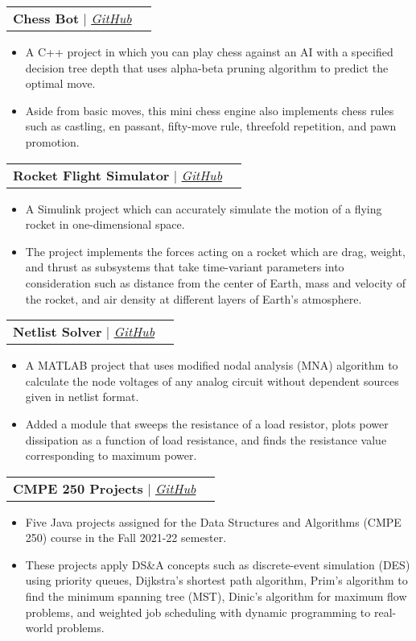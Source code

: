 \documentclass[letterpaper,11pt]{article}
\makeatletter
\newcommand{\resumeItem}[1]{
  \item\small{
    { #1 \vspace{-2pt} }
  }
}
\newcommand{\resumeProjectHeading}[2]{
    \vspace{-2pt}\item
    \begin{tabular*}{0.97\textwidth}{l@{\extracolsep {\fill} } r}
      \small#1 & #2 \\
    \end{tabular*}\vspace{-7pt}
}
\newcommand{\resumeItemListStart}{\begin{itemize} }
\newcommand{\resumeItemListEnd}{\end{itemize}\vspace{-5pt} }
\makeatother
\begin{document}
      \resumeProjectHeading
        {\textbf{Chess Bot} $|$ \emph{\href{https://github.com/arasgungore/chess-bot}{\color{blue}GitHub} } }{}
          \resumeItemListStart
            \resumeItem{A C++ project in which you can play chess against an AI with a specified decision tree depth that uses alpha-beta pruning algorithm to predict the optimal move.}
            \resumeItem{Aside from basic moves, this mini chess engine also implements chess rules such as castling, en passant, fifty-move rule, threefold repetition, and pawn promotion.}
          \resumeItemListEnd
      
      \resumeProjectHeading
        {\textbf{Rocket Flight Simulator} $|$ \emph{\href{https://github.com/arasgungore/rocket-flight-simulator}{\color{blue}GitHub} } }{}
          \resumeItemListStart
            \resumeItem{A Simulink project which can accurately simulate the motion of a flying rocket in one-dimensional space.}
            \resumeItem{The project implements the forces acting on a rocket which are drag, weight, and thrust as subsystems that take time-variant parameters into consideration such as distance from the center of Earth, mass and velocity of the rocket, and air density at different layers of Earth's atmosphere.}
          \resumeItemListEnd
      
      \resumeProjectHeading
        {\textbf{Netlist Solver} $|$ \emph{\href{https://github.com/arasgungore/netlist-solver}{\color{blue}GitHub} } }{}
          \resumeItemListStart
            \resumeItem{A MATLAB project that uses modified nodal analysis (MNA) algorithm to calculate the node voltages of any analog circuit without dependent sources given in netlist format.}
            \resumeItem{Added a module that sweeps the resistance of a load resistor, plots power dissipation as a function of load resistance, and finds the resistance value corresponding to maximum power.}
          \resumeItemListEnd
      
      \resumeProjectHeading
        {\textbf{CMPE 250 Projects} $|$ \emph{\href{https://github.com/arasgungore/CMPE250-projects}{\color{blue}GitHub} } }{}
          \resumeItemListStart
            \resumeItem{Five Java projects assigned for the Data Structures and Algorithms (CMPE 250) course in the Fall 2021-22 semester.}
            \resumeItem{These projects apply DS\&A concepts such as discrete-event simulation (DES) using priority queues, Dijkstra's shortest path algorithm, Prim's algorithm to find the minimum spanning tree (MST), Dinic's algorithm for maximum flow problems, and weighted job scheduling with dynamic programming to real-world problems.}
          \resumeItemListEnd
      
\end{document}
